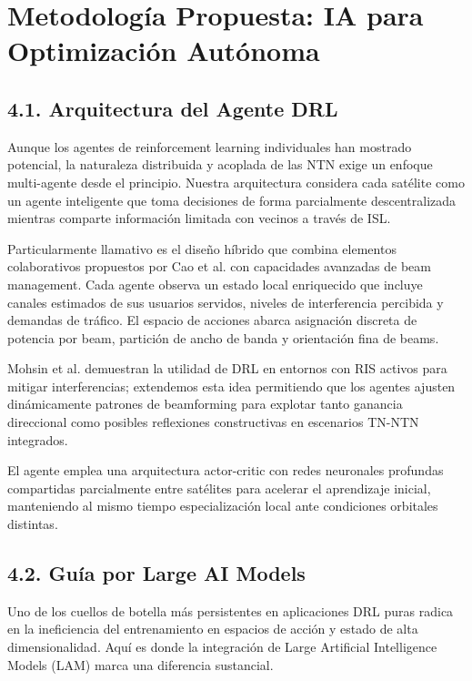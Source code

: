 \section{Metodología Propuesta: IA para Optimización Autónoma}

\subsection{4.1. Arquitectura del Agente DRL}

Aunque los agentes de reinforcement learning individuales han mostrado potencial, la naturaleza distribuida y acoplada de las NTN exige un enfoque multi-agente desde el principio. Nuestra arquitectura considera cada satélite como un agente inteligente que toma decisiones de forma parcialmente descentralizada mientras comparte información limitada con vecinos a través de ISL.

Particularmente llamativo es el diseño híbrido que combina elementos colaborativos propuestos por Cao et al. \cite{Cao2023} con capacidades avanzadas de beam management. Cada agente observa un estado local enriquecido que incluye canales estimados de sus usuarios servidos, niveles de interferencia percibida y demandas de tráfico. El espacio de acciones abarca asignación discreta de potencia por beam, partición de ancho de banda y orientación fina de beams.

Mohsin et al. \cite{Mohsin2025} demuestran la utilidad de DRL en entornos con RIS activos para mitigar interferencias; extendemos esta idea permitiendo que los agentes ajusten dinámicamente patrones de beamforming para explotar tanto ganancia direccional como posibles reflexiones constructivas en escenarios TN-NTN integrados. 

El agente emplea una arquitectura actor-critic con redes neuronales profundas compartidas parcialmente entre satélites para acelerar el aprendizaje inicial, manteniendo al mismo tiempo especialización local ante condiciones orbitales distintas.

\subsection{4.2. Guía por Large AI Models}

Uno de los cuellos de botella más persistentes en aplicaciones DRL puras radica en la ineficiencia del entrenamiento en espacios de acción y estado de alta dimensionalidad. Aquí es donde la integración de Large Artificial Intelligence Models (LAM) marca una diferencia sustancial.

